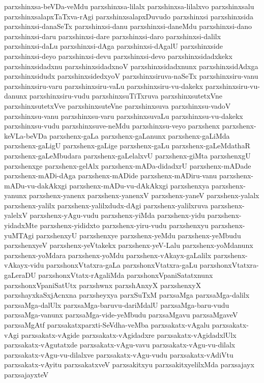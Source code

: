 {parxshinxsa-beVDa-veMdu
parxshinxsa-lilalx
parxshinxsa-lilalxvo
parxshinxsalu
parxshinxsalapxTaTxva-rAgi
parxshinxsalapxDuvudo
parxshinxsi
parxshinxsida
parxshinxsi-danaSeTx
parxshinxsi-danu
parxshinxsi-daneMdu
parxshinxsi-dano
parxshinxsi-daru
parxshinxsi-dare
parxshinxsi-daro
parxshinxsi-dalilx
parxshinxsi-daLu
parxshinxsi-dAga
parxshinxsi-dAgalU
parxshinxside
parxshinxsi-deyo
parxshinxsi-devu
parxshinxsi-devo
parxshinxsidadxkekx
parxshinxsidadxnu
parxshinxsidadxnoV
parxshinxsidadxnunx
parxshinxsidAdxga
parxshinxsidudx
parxshinxsidedxyoV
parxshinxsiruva-naSeTx
parxshinxsiru-vanu
parxshinxsiru-varu
parxshinxsiru-vaLu
parxshinxsiru-vu-dakekx
parxshinxsiru-vu-danunx
parxshinxsiru-vudu
parxshinxsuTiTxruva
parxshinxsutetxVne
parxshinxsutetxVve
parxshinxsuteVne
parxshinxsuva
parxshinxsu-vadoV
parxshinxsu-vanu
parxshinxsu-varu
parxshinxsuvaLu
parxshinxsu-vu-dakekx
parxshinxsu-vudu
parxshinxsuve-neMdu
parxshinxsu-veyo
parxshenx
parxshenx-keVLa-beVDa
parxshenx-gaLa
parxshenx-gaLanunx
parxshenx-gaLiMda
parxshenx-gaLigU
parxshenx-gaLige
parxshenx-gaLu
parxshenx-gaLeMdathaR
parxshenx-gaLeMbudara
parxshenx-gaLelalxvU
parxshenx-giMta
parxshenxgU
parxshenxge
parxshenx-gelAlx
parxshenx-mADa-didadxrU
parxshenx-mADade
parxshenx-mADi-dAga
parxshenx-mADide
parxshenx-mADiru-vanu
parxshenx-mADu-vu-dakAkxgi
parxshenx-mADu-vu-dAkAkxgi
parxshenxya
parxshenx-yanunx
parxshenx-yanenx
parxshenx-yanenxV
parxshenx-yaneV
parxshenx-yalalx
parxshenx-yalilx
parxshenx-yalilxdudx-dAgi
parxshenx-yalilxruva
parxshenx-yalelxV
parxshenx-yAgu-vudu
parxshenx-yiMda
parxshenx-yidu
parxshenx-yidadxMte
parxshenx-yididxto
parxshenx-yiru-vudu
parxshenxyu
parxshenx-yuMTAgi
parxshenxyU
parxshenxye
parxshenx-yeMdu
parxshenx-yeMbudu
parxshenxyeV
parxshenx-yeVtakekx
parxshenx-yeV-Lalu
parxshenx-yoMdanunx
parxshenx-yoMdara
parxshenx-yoMdu
parxshenx-vAkayx-gaLalilx
parxshenx-vAkayx-vidu
parxshonxVtatxra-gaLa
parxshonxVtatxra-gaLu
parxshonxVtatxra-gaLeraDU
parxshonxVtatx-rAgaliMda
parxshonxVpaniSatatxnunx
parxshonxVpaniSatUtx
parxshwnx
parxshAnxyX
parxshenxyX
parxshayxkaSxjAcnxna
parxsheyxya
parxSuTxM
parxsaMga
parxsaMga-dalilx
parxsaMga-dalUlx
parxsaMga-baruvu-dariMdalU
parxsaMga-baru-vudu
parxsaMga-vanunx
parxsaMga-vide-yeMbudu
parxsaMgavu
parxsaMgaveV
parxsaMgAtf
parxsakatxparxti-SeVdha-veMba
parxsakatx-vAgalu
parxsakatx-vAgi
parxsakatx-vAgide
parxsakatx-vAgidadxre
parxsakatx-vAgidadxlUlx
parxsakatx-vAgutatxde
parxsakatx-vAgu-vavu
parxsakatx-vAgu-vu-dilalx
parxsakatx-vAgu-vu-dilalxve
parxsakatx-vAgu-vudu
parxsakatx-vAdiVtu
parxsakatx-vAyitu
parxsakatxveV
parxsakitxyu
parxsakitxyelilxMda
parxsajayx
parxsajayxteV
}
